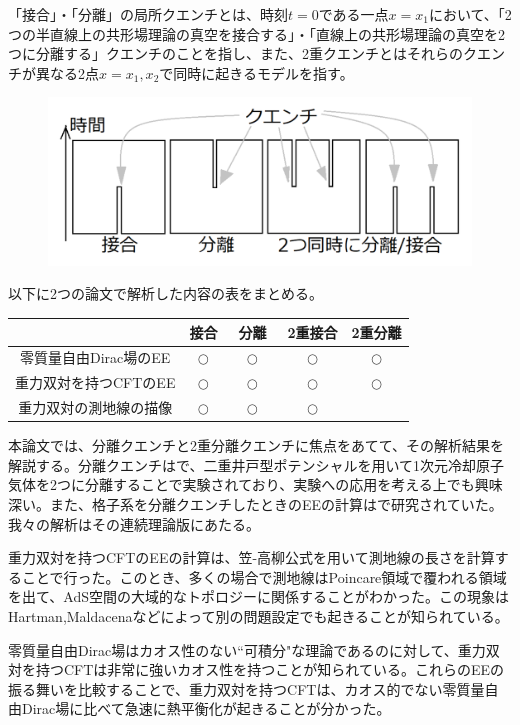 「接合」・「分離」の局所クエンチとは、時刻$t=0$である一点$x=x_1$において、「2つの半直線上の共形場理論の真空を接合する」・「直線上の共形場理論の真空を2つに分離する」クエンチのことを指し、また、2重クエンチとはそれらのクエンチが異なる2点$x=x_1,x_2$で同時に起きるモデルを指す。
\begin{figure}[H]
	\centering
	\includegraphics[width=0.7\linewidth]{quenchfig.pdf}
\end{figure}

以下に2つの論文で解析した内容の表をまとめる。
\begin{table}[H]
	\centering
	\begin{tabular}{|c||c|c|c|c|}\hline\hline
		  & 接合 & 分離　& 2重接合 & 2重分離 \\ \hline
		零質量自由Dirac場のEE & $\bigcirc$ & $\bigcirc$ & $\bigcirc$ & $\bigcirc$ \\
		重力双対を持つCFTのEE & $\bigcirc$ & $\bigcirc$ & $\bigcirc$ & $\bigcirc$ \\
		重力双対の測地線の描像 & $\bigcirc$ & $\bigcirc$ & $\bigcirc$ &  \\ \hline
	\end{tabular}
\end{table}

本論文では、分離クエンチと2重分離クエンチに焦点をあてて、その解析結果を解説する。分離クエンチは\cite{gring2012relaxation}で、二重井戸型ポテンシャルを用いて1次元冷却原子気体を2つに分離することで実験されており、実験への応用を考える上でも興味深い。また、格子系を分離クエンチしたときのEEの計算は\cite{Zamora_2014}で研究されていた。我々の解析はその連続理論版にあたる。

重力双対を持つCFTのEEの計算は、笠-高柳公式を用いて測地線の長さを計算することで行った。このとき、多くの場合で測地線はPoincare領域で覆われる領域を出て、AdS空間の大域的なトポロジーに関係することがわかった。この現象はHartman,Maldacena\cite{hartman2013time}などによって別の問題設定でも起きることが知られている。

零質量自由Dirac場はカオス性のない``可積分"な理論であるのに対して、重力双対を持つCFTは非常に強いカオス性を持つことが知られている\cite{Maldacena:2015waa}。これらのEEの振る舞いを比較することで、重力双対を持つCFTは、カオス的でない零質量自由Dirac場に比べて急速に熱平衡化が起きることが分かった。

